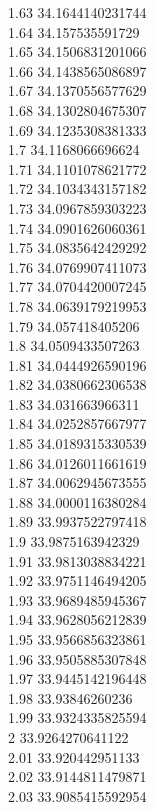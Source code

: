 {1.63	34.1644140231744\\
1.64	34.157535591729\\
1.65	34.1506831201066\\
1.66	34.1438565086897\\
1.67	34.1370556577629\\
1.68	34.1302804675307\\
1.69	34.1235308381333\\
1.7	34.1168066696624\\
1.71	34.1101078621772\\
1.72	34.1034343157182\\
1.73	34.0967859303223\\
1.74	34.0901626060361\\
1.75	34.0835642429292\\
1.76	34.0769907411073\\
1.77	34.0704420007245\\
1.78	34.0639179219953\\
1.79	34.057418405206\\
1.8	34.0509433507263\\
1.81	34.0444926590196\\
1.82	34.0380662306538\\
1.83	34.031663966311\\
1.84	34.0252857667977\\
1.85	34.0189315330539\\
1.86	34.0126011661619\\
1.87	34.0062945673555\\
1.88	34.0000116380284\\
1.89	33.9937522797418\\
1.9	33.9875163942329\\
1.91	33.9813038834221\\
1.92	33.9751146494205\\
1.93	33.9689485945367\\
1.94	33.9628056212839\\
1.95	33.9566856323861\\
1.96	33.9505885307848\\
1.97	33.9445142196448\\
1.98	33.93846260236\\
1.99	33.9324335825594\\
2	33.9264270641122\\
2.01	33.920442951133\\
2.02	33.9144811479871\\
2.03	33.9085415592954\\
}

